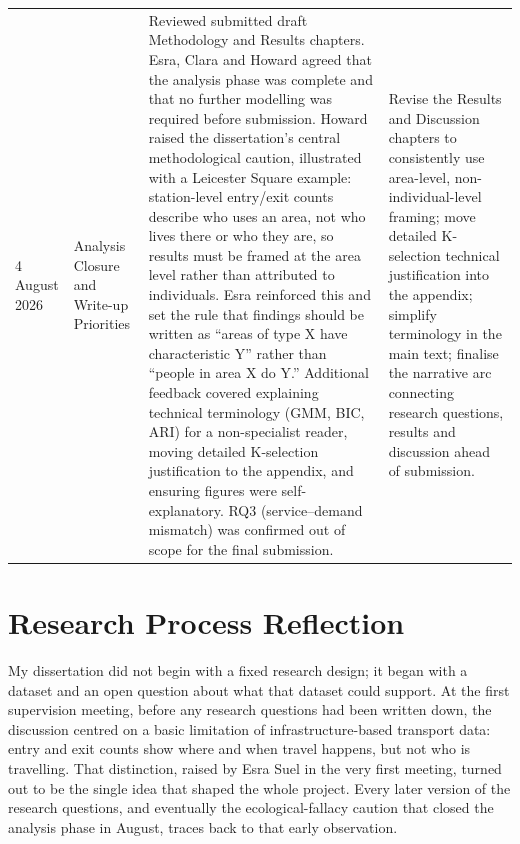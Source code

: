 \begin{landscape}
\begin{longtable}{@{}p{2.4cm} p{4.0cm} p{8.0cm} p{6.6cm}@{}}
4 August 2026 & Analysis Closure and Write-up Priorities & Reviewed submitted draft Methodology and Results chapters. Esra, Clara and Howard agreed that the analysis phase was complete and that no further modelling was required before submission. Howard raised the dissertation's central methodological caution, illustrated with a Leicester Square example: station-level entry/exit counts describe who uses an area, not who lives there or who they are, so results must be framed at the area level rather than attributed to individuals. Esra reinforced this and set the rule that findings should be written as ``areas of type X have characteristic Y'' rather than ``people in area X do Y.'' Additional feedback covered explaining technical terminology (GMM, BIC, ARI) for a non-specialist reader, moving detailed K-selection justification to the appendix, and ensuring figures were self-explanatory. RQ3 (service--demand mismatch) was confirmed out of scope for the final submission. & Revise the Results and Discussion chapters to consistently use area-level, non-individual-level framing; move detailed K-selection technical justification into the appendix; simplify terminology in the main text; finalise the narrative arc connecting research questions, results and discussion ahead of submission. \\
\end{longtable}
\endgroup
\end{landscape}
\normalsize

\section{Research Process Reflection}

My dissertation did not begin with a fixed research design; it began with a dataset and an open question about what that dataset could support. At the first supervision meeting, before any research questions had been written down, the discussion centred on a basic limitation of infrastructure-based transport data: entry and exit counts show where and when travel happens, but not who is travelling. That distinction, raised by Esra Suel in the very first meeting, turned out to be the single idea that shaped the whole project. Every later version of the research questions, and eventually the ecological-fallacy caution that closed the analysis phase in August, traces back to that early observation.

